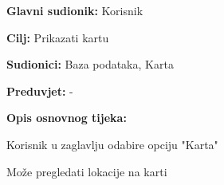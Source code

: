 				\noindent {}
					\begin{packed_item}
	
						\item \textbf{Glavni sudionik: } Korisnik
						\item  \textbf{Cilj:} Prikazati kartu
						\item  \textbf{Sudionici:} Baza podataka, Karta
						\item  \textbf{Preduvjet:} -
						\item  \textbf{Opis osnovnog tijeka:}
						
						\item[] \begin{packed_enum}
	
							\item Korisnik u zaglavlju odabire opciju "Karta"
							\item Može pregledati lokacije na karti
							
						\end{packed_enum}
					\end{packed_item}
					
